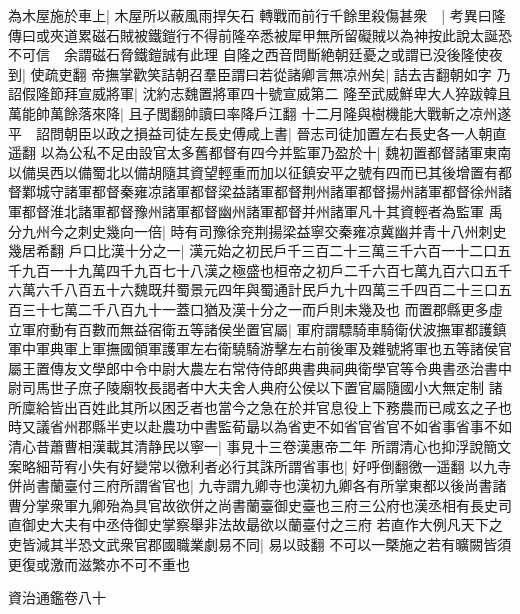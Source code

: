 為木屋施於車上|{
	木屋所以蔽風雨捍矢石}
轉戰而前行千餘里殺傷甚衆　|{
	考異曰隆傳曰或夾道累磁石賊被鐵鎧行不得前隆卒悉被犀甲無所留礙賊以為神按此說太誕恐不可信　余謂磁石脅鐵鎧誠有此理}
自隆之西音問斷絶朝廷憂之或謂已没後隆使夜到|{
	使疏吏翻}
帝撫掌歡笑詰朝召羣臣謂曰若從諸卿言無凉州矣|{
	詰去吉翻朝如字}
乃詔假隆節拜宣威將軍|{
	沈約志魏置將軍四十號宣威第二}
隆至武威鮮卑大人猝跋韓且萬能帥萬餘落來降|{
	且子閭翻帥讀曰率降戶江翻}
十二月隆與樹機能大戰斬之凉州遂平　詔問朝臣以政之損益司徒左長史傅咸上書|{
	晉志司徒加置左右長史各一人朝直遥翻}
以為公私不足由設官太多舊都督有四今并監軍乃盈於十|{
	魏初置都督諸軍東南以備吳西以備蜀北以備胡隨其資望輕重而加以征鎮安平之號有四而已其後增置有都督鄴城守諸軍都督秦雍凉諸軍都督梁益諸軍都督荆州諸軍都督揚州諸軍都督徐州諸軍都督淮北諸軍都督豫州諸軍都督幽州諸軍都督并州諸軍凡十其資輕者為監軍}
禹分九州今之刺史幾向一倍|{
	時有司豫徐兖荆揚梁益寧交秦雍凉冀幽并青十八州刺史幾居希翻}
戶口比漢十分之一|{
	漢元始之初民戶千三百二十三萬三千六百一十二口五千九百一十九萬四千九百七十八漢之極盛也桓帝之初戶二千六百七萬九百六口五千六萬六千八百五十六魏既幷蜀景元四年與蜀通計民戶九十四萬三千四百二十三口五百三十七萬二千八百九十一蓋口猶及漢十分之一而戶則未幾及也}
而置郡縣更多虛立軍府動有百數而無益宿衛五等諸侯坐置官屬|{
	軍府謂驃騎車騎衛伏波撫軍都護鎮軍中軍典軍上軍撫國領軍護軍左右衛驍騎游擊左右前後軍及雜號將軍也五等諸侯官屬王置傳友文學郎中令中尉大農左右常侍侍郎典書典祠典衛學官等令典書丞治書中尉司馬世子庶子陵廟牧長謁者中大夫舍人典府公侯以下置官屬隨國小大無定制}
諸所廩給皆出百姓此其所以困乏者也當今之急在於并官息役上下務農而已咸玄之子也時又議省州郡縣半吏以赴農功中書監荀朂以為省吏不如省官省官不如省事省事不如清心昔蕭曹相漢載其清静民以寧一|{
	事見十三卷漢惠帝二年}
所謂清心也抑浮說簡文案略細苛宥小失有好變常以徼利者必行其誅所謂省事也|{
	好呼倒翻徼一遥翻}
以九寺併尚書蘭臺付三府所謂省官也|{
	九寺謂九卿寺也漢初九卿各有所掌東都以後尚書諸曹分掌衆軍九卿殆為具官故欲併之尚書蘭臺御史臺也三府三公府也漢丞相有長史司直御史大夫有中丞侍御史掌察舉非法故朂欲以蘭臺付之三府}
若直作大例凡天下之吏皆減其半恐文武衆官郡國職業劇易不同|{
	易以豉翻}
不可以一槩施之若有曠闕皆須更復或激而滋繁亦不可不重也

資治通鑑卷八十
